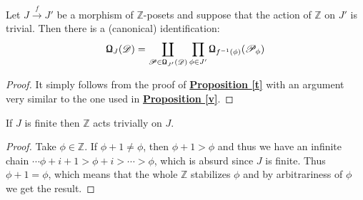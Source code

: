 \begin{prop}\label{aab}
Let $J \overset{f}{\longrightarrow} J'$ be a morphism of $\mathbb{Z}$-posets and suppose that the action of $\mathbb{Z}$ on $J'$ is trivial. Then there is a (canonical) identification: 
$$\textnormal{\Libra}_J(\mathscr{D})=\coprod_{\mathscr{P} \in \textnormal{\Libra}_{J'}(\mathscr{D})} \prod_{ \phi \in J'} \textnormal{\Libra}_{f^{-1}(\phi)}(\mathscr{P}_{\phi})$$ 
\end{prop}

\begin{proof}
It simply follows from the proof of \hyperref[t]{\textbf{Proposition \ref*{t}}} with an argument very similar to the one used in  \hyperref[v]{\textbf{Proposition \ref*{v}}}.
\end{proof}

\begin{prop}
If $J$ is finite then $\mathbb{Z}$ acts trivially on $J$. 
\end{prop}

\begin{proof}
Take $\phi \in \mathbb{Z}$. If $\phi + 1 \not = \phi$, then $\phi + 1 > \phi$ and thus we have an infinite chain $ \cdots \phi + i + 1  > \phi + i > \cdots > \phi$, which is absurd since $J$ is finite. Thus $\phi + 1 = \phi$, which means that the whole $\mathbb{Z}$ stabilizes $\phi$ and by arbitrariness of $\phi$ we get the result.   
\end{proof}

